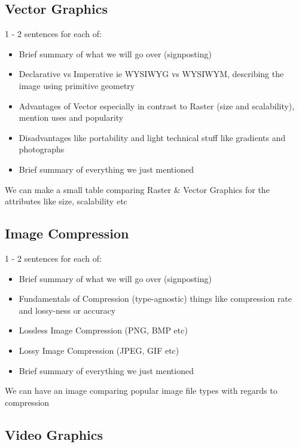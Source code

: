 \documentclass[12pt]{article}
\begin{document}
    \subsection{Vector Graphics}

    1 - 2 sentences for each of:

    \begin{itemize}
        \item Brief summary of what we will go over (signposting)
        \item Declarative vs Imperative ie WYSIWYG vs WYSIWYM, describing the image using primitive geometry
        \item Advantages of Vector especially in contrast to Raster (size and scalability), mention uses and popularity
        \item Disadvantages like portability and light technical stuff like gradients and photographs
        \item Brief summary of everything we just mentioned
    \end{itemize}

    We can make a small table comparing Raster \& Vector Graphics for the attributes like size, scalability etc

    \subsection{Image Compression}

    1 - 2 sentences for each of:

    \begin{itemize}
        \item Brief summary of what we will go over (signposting)
        \item Fundamentals of Compression (type-agnostic) things like compression rate and lossy-ness or accuracy
        \item Lossless Image Compression (PNG, BMP etc)
        \item Lossy Image Compression (JPEG, GIF etc)
        \item Brief summary of everything we just mentioned
    \end{itemize}

    We can have an image comparing popular image file types with regards to compression

    \subsection{Video Graphics}
\end{document}
